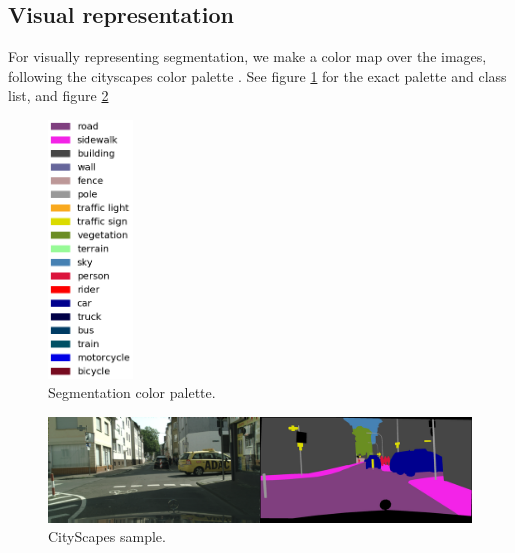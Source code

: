 \subsection{Visual representation}
\label{sec:seg_colors}
For visually representing segmentation, we make a color map over the images, following
the cityscapes color palette \cite{cordts_cityscapes}. See figure \ref{fig:segmentation_colors}
for the exact palette and class list, and figure \ref{fig:cs_sample}

\begin{figure}[ht]
	\begin{center}
	\includegraphics[width=0.2\textwidth]{./figures/seg_colors.png}
	\caption[Segmentation color palette]{
        Segmentation color palette.
        }
	\label{fig:segmentation_colors}
	\end{center}
\end{figure}

\begin{figure}[ht]
	\begin{center}
	\includegraphics[width=1\textwidth]{./figures/cityscapes_sample.png}
	\caption[CityScapes sample]{
        CityScapes sample.
        }
	\label{fig:cs_sample}
	\end{center}
\end{figure}